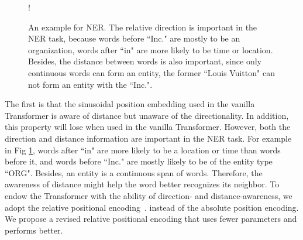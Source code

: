 \documentclass[11pt,a4paper]{article}
\begin{document}
\begin{figure}[!htb]
    \centering
      \resizebox {0.9\linewidth} {!} {
      }
    \caption{An example for NER. The relative direction is important in the NER task, because words before ``Inc." are mostly to be an organization, words after ``in" are more likely to be time or location. Besides, the distance between words is also important, since only continuous words can form an entity, the former ``Louis Vuitton" can not form an entity with the ``Inc.". }
    \label{fig:example}
\end{figure}

The first is that the sinusoidal position embedding used in the vanilla Transformer is aware of distance  but unaware of the directionality. In addition, this property will lose when used in the vanilla Transformer. However, both the direction and distance information are important in the NER task. For example in Fig \ref{fig:example}, words after ``in" are more likely to be a location or time than words before it, and words before ``Inc." are mostly likely to be of the entity type ``ORG". Besides, an entity is a continuous span of words. Therefore, the awareness of distance might help the word better recognizes its neighbor. To endow the Transformer
with the ability of direction- and distance-awareness, we adopt the relative positional encoding~\cite{DBLP:conf/naacl/ShawUV18,DBLP:conf/iclr/HuangVUSHSDHDE19,DBLP:conf/acl/DaiYYCLS19}. instead of the absolute position encoding. We propose a revised relative positional encoding that uses fewer parameters and performs better.
\end{document}
